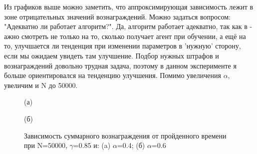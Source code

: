 \documentclass[a4paper]{report}
\theoremstyle{definition}
\theoremstyle{plain}
\theoremstyle{remark}
\theoremstyle{remark}
\theoremstyle{definition}
\begin{document}
Из графиков выше можно заметить, что аппроксимирующая зависимость лежит в зоне отрицательных значений вознаграждений. Можно задаться вопросом: "Адекватно ли работает алгоритм?". Да, алгоритм работает адекватно, так как в - ажно смотреть не только на то, сколько получает агент при обучении, а ещё на то, улучшается ли тенденция при изменении параметров в 'нужную' сторону, если мы ожидаем увидеть там улучшение. Подбор нужных штрафов и вознаграждений довольно трудная задача, поэтому в данном эксперименте я больше ориентировался на тенденцию улучшения. Помимо увеличения $\alpha$, увеличим и N до 50000.
\begin{figure}[H]
    \begin{minipage}[H]{0.49\linewidth}
        (а)\\
    \end{minipage}
    \hfill
    \begin{minipage}[H]{0.49\linewidth}
        (б)\\
    \end{minipage}
      \caption{Зависимость суммарного вознаграждения от пройденного времени при N=50000, $\gamma$=0.85 и: (a) $\alpha$=0.4; (б) $\alpha$=0.6}
\end{figure}
\end{document}
